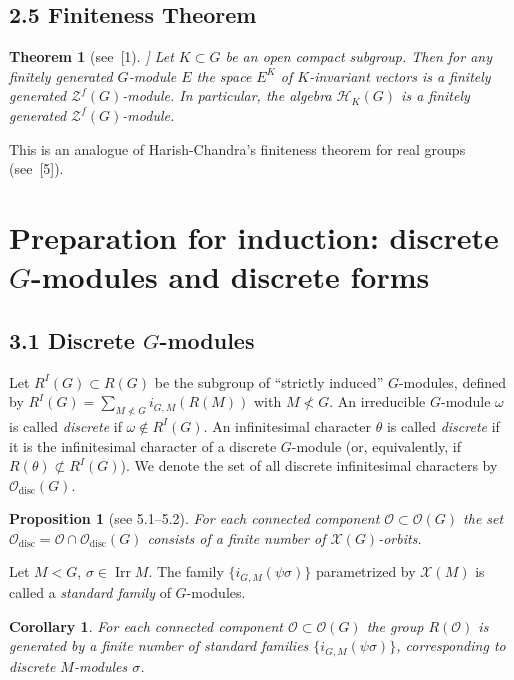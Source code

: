 \documentclass[12pt,a4paper]{article}
\theoremstyle{plain}
\newtheorem{theorem}{Theorem}
\newtheorem{proposition}{Proposition}
\newtheorem{corollary}{Corollary}
\theoremstyle{definition}
\theoremstyle{remark}
\DeclareMathOperator{\Irr}{Irr}
\DeclareMathOperator{\disc}{disc}
\newcommand{\cH}{\mathscr{H}}
\newcommand{\cO}{\mathcal{O}}
\newcommand{\cZ}{\mathcal{Z}}
\newcommand{\cX}{\mathcal{X}}
\begin{document}
\subsection*{2.5 Finiteness Theorem}

\begin{theorem}[see~[1]]
Let $K \subset G$ be an open compact subgroup. Then for any finitely generated $G$-module $E$ the space $E^K$ of $K$-invariant vectors is a finitely generated $\cZ^f(G)$-module. In particular, the algebra $\cH_K(G)$ is a finitely generated $\cZ^f(G)$-module.
\end{theorem}

This is an analogue of Harish-Chandra's finiteness theorem for real groups (see~[5]).

\section*{Preparation for induction: discrete $G$-modules and discrete forms}

\subsection*{3.1 Discrete $G$-modules}

Let $R^I(G) \subset R(G)$ be the subgroup of ``strictly induced'' $G$-modules, defined by $R^I(G) = \sum_{M \not< G} i_{G,M}(R(M))$ with $M \not< G$. An irreducible $G$-module $\omega$ is called \emph{discrete} if $\omega \notin R^I(G)$. An infinitesimal character $\theta$ is called \emph{discrete} if it is the infinitesimal character of a discrete $G$-module (or, equivalently, if $R(\theta) \not\subset R^I(G)$). We denote the set of all discrete infinitesimal characters by $\cO_{\disc}(G)$.

\begin{proposition}[see 5.1--5.2]
For each connected component $\cO \subset \cO(G)$ the set $\cO_{\disc} = \cO \cap \cO_{\disc}(G)$ consists of a finite number of $\cX(G)$-orbits.
\end{proposition}

Let $M < G$, $\sigma \in \Irr M$. The family $\{i_{G,M}(\psi\sigma)\}$ parametrized by $\cX(M)$ is called a \emph{standard family} of $G$-modules.

\begin{corollary}
For each connected component $\cO \subset \cO(G)$ the group $R(\cO)$ is generated by a finite number of standard families $\{i_{G,M}(\psi\sigma)\}$, corresponding to discrete $M$-modules $\sigma$.
\end{corollary}
\end{document}
